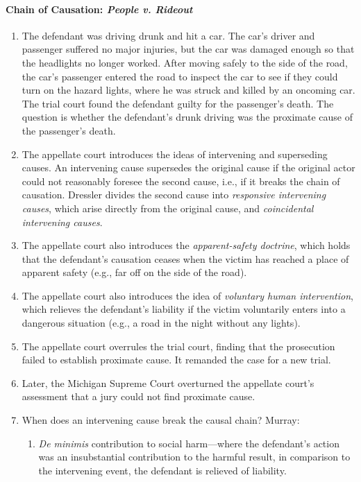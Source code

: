 \paragraph{Chain of Causation: \emph{People v. Rideout}}

\begin{enumerate}
    \item The defendant was driving drunk and hit a car. The car's driver and passenger suffered no major injuries, but the car was damaged enough so that the headlights no longer worked. After moving safely to the side of the road, the car's passenger entered the road to inspect the car to see if they could turn on the hazard lights, where he was struck and killed by an oncoming car. The trial court found the defendant guilty for the passenger's death. The question is whether the defendant's drunk driving was the proximate cause of the passenger's death.
    \item The appellate court introduces the ideas of intervening and superseding causes. An intervening cause supersedes the original cause if the original actor could not reasonably foresee the second cause, i.e., if it breaks the chain of causation. Dressler divides the second cause into \emph{responsive intervening causes}, which arise directly from the original cause, and \emph{coincidental intervening causes}.
    \item The appellate court also introduces the \emph{apparent-safety doctrine}, which holds that the defendant's causation ceases when the victim has reached a place of apparent safety (e.g., far off on the side of the road).
    \item The appellate court also introduces the idea of \emph{voluntary human intervention}, which relieves the defendant's liability if the victim voluntarily enters into a dangerous situation (e.g., a road in the night without any lights).
    \item The appellate court overrules the trial court, finding that the prosecution failed to establish proximate cause. It remanded the case for a new trial.
    \item Later, the Michigan Supreme Court overturned the appellate court's assessment that a jury could not find proximate cause.
    \item When does an intervening cause break the causal chain? Murray:
    \begin{enumerate}
        \item \emph{De minimis} contribution to social harm---where the defendant's action was an insubstantial contribution to the harmful result, in comparison to the intervening event, the defendant is relieved of liability.

\end{enumerate}
\end{enumerate}
